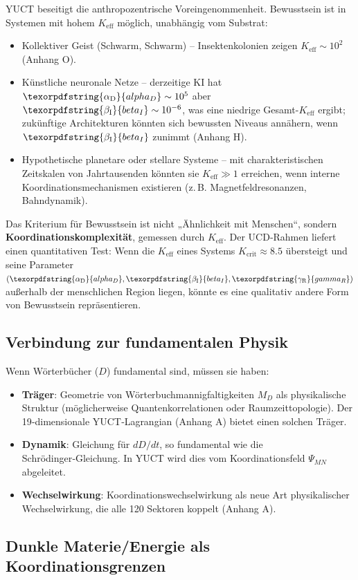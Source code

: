 \documentclass[12pt,a4paper]{article}
\DeclareRobustCommand{\alD}{\texorpdfstring{\ensuremath{\alpha_{\mathrm{D}}}}{alpha_D}}
\DeclareRobustCommand{\beI}{\texorpdfstring{\ensuremath{\beta_{\mathrm{I}}}}{beta_I}}
\DeclareRobustCommand{\gaR}{\texorpdfstring{\ensuremath{\gamma_{\mathrm{R}}}}{gamma_R}}
\newcommand{\eff}{\mathrm{eff}}
\newcommand{\Ke}{K_{\eff}}
\newcommand{\Kcrit}{K_{\mathrm{crit}}}
\begin{document}
	YUCT beseitigt die anthropozentrische Voreingenommenheit. Bewusstsein ist in Systemen mit hohem $\Ke$ möglich, unabhängig vom Substrat:
	\begin{itemize}
		\item Kollektiver Geist (Schwarm, Schwarm) – Insektenkolonien zeigen $\Ke \sim 10^2$ (Anhang O).
		\item Künstliche neuronale Netze – derzeitige KI hat $\alD \sim 10^5$ aber $\beI \sim 10^{-6}$, was eine niedrige Gesamt-$\Ke$ ergibt; zukünftige Architekturen könnten sich bewussten Niveaus annähern, wenn $\beI$ zunimmt (Anhang H).
		\item Hypothetische planetare oder stellare Systeme – mit charakteristischen Zeitskalen von Jahrtausenden könnten sie $\Ke \gg 1$ erreichen, wenn interne Koordinationsmechanismen existieren (z. B. Magnetfeldresonanzen, Bahndynamik).
	\end{itemize}
	
	Das Kriterium für Bewusstsein ist nicht „Ähnlichkeit mit Menschen“, sondern \textbf{Koordinationskomplexität}, gemessen durch $\Ke$. Der UCD‑Rahmen liefert einen quantitativen Test: Wenn die $\Ke$ eines Systems $\Kcrit \approx 8.5$ übersteigt und seine Parameter $(\alD, \beI, \gaR)$ außerhalb der menschlichen Region liegen, könnte es eine qualitativ andere Form von Bewusstsein repräsentieren.
	
	\subsection{Verbindung zur fundamentalen Physik}
	
	Wenn Wörterbücher ($D$) fundamental sind, müssen sie haben:
	\begin{itemize}
		\item \textbf{Träger}: Geometrie von Wörterbuchmannigfaltigkeiten $M_D$ als physikalische Struktur (möglicherweise Quantenkorrelationen oder Raumzeittopologie). Der 19‑dimensionale YUCT‑Lagrangian (Anhang A) bietet einen solchen Träger.
		\item \textbf{Dynamik}: Gleichung für $dD/dt$, so fundamental wie die Schrödinger‑Gleichung. In YUCT wird dies vom Koordinationsfeld $\Psi_{MN}$ abgeleitet.
		\item \textbf{Wechselwirkung}: Koordinationswechselwirkung als neue Art physikalischer Wechselwirkung, die alle 120 Sektoren koppelt (Anhang A).
	\end{itemize}
	
	\subsection{Dunkle Materie/Energie als Koordinationsgrenzen}
	
\end{document}

